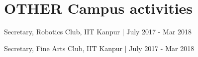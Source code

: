 \documentclass[]{deedy-resume-openfont}
\begin{document}
\begin{minipage}[t]{0.66\textwidth}

\section{OTHER Campus activities}
\vspace{\topsep} %
\begin{tightemize}
\item Secretary, Robotics Club, IIT Kanpur | July 2017 - Mar 2018 \\
\item Secretary, Fine Arts Club, IIT Kanpur | July 2017 - Mar 2018 \\
\end{tightemize}


\end{minipage} 
\end{document}
